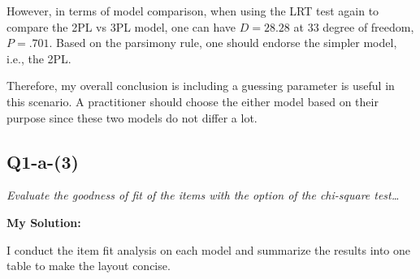 \documentclass[
]{article}
\begin{document}
However, in terms of model comparison, when using the LRT test again to
compare the 2PL vs 3PL model, one can have \(D = 28.28\) at \(33\)
degree of freedom, \(P = .701\). Based on the parsimony rule, one should
endorse the simpler model, i.e., the 2PL.

Therefore, my overall conclusion is including a guessing parameter is
useful in this scenario. A practitioner should choose the either model
based on their purpose since these two models do not differ a lot.

\hypertarget{q1-a-3}{%
\subsection{Q1-a-(3)}\label{q1-a-3}}

\emph{Evaluate the goodness of fit of the items with the option of the
chi-square test\ldots{}}

\textbf{My Solution:}

I conduct the item fit analysis on each model and summarize the results
into one table to make the layout concise.
\end{document}
